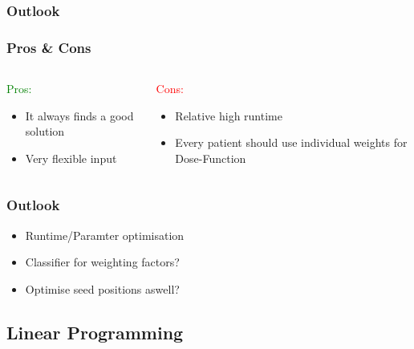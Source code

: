 \documentclass{beamer}
\begin{document}
\subsubsection{Outlook}
\begin{frame}
\frametitle{Pros \& Cons}

\begin{columns}[T] %
\begin{column}{.48\textwidth}
\textcolor{green}{Pros:}
\begin{itemize}
\item It always finds a good solution
\item Very flexible input
\end{itemize}

\end{column}%
\hfill%

\begin{column}{.48\textwidth}
\textcolor{red}{Cons:}

\begin{itemize}
\item Relative high runtime
\item Every patient should use individual weights for Dose-Function
\end{itemize}
\end{column}%
\end{columns}
\end{frame}

\begin{frame}
\frametitle{Outlook}
\begin{itemize}
\item Runtime/Paramter optimisation
\item Classifier for weighting factors?
\item Optimise seed positions aswell?
\end{itemize}
 
\end{frame}  
 
 
 \subsection{Linear Programming}
 \frame{\tableofcontents[currentsubsection]}
\end{document}
